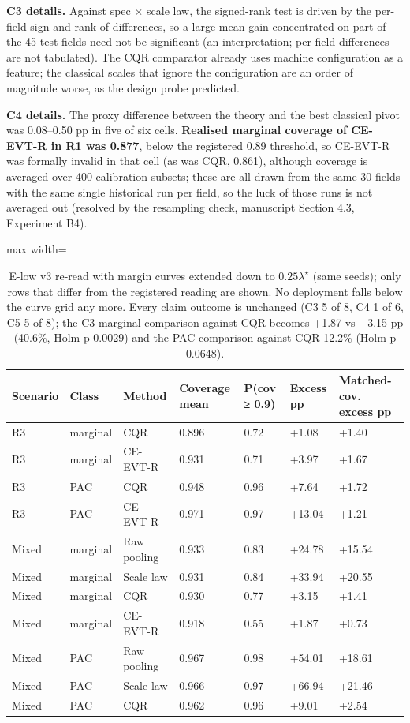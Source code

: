 \documentclass[preprint,12pt,authoryear]{elsarticle}
\begin{document}
\textbf{C3 details.} Against spec × scale law, the signed-rank test is driven by the per-field sign and rank of differences, so a large mean gain concentrated on part of the 45 test fields need not be significant (an interpretation; per-field differences are not tabulated). The CQR comparator already uses machine configuration as a feature; the classical scales that ignore the configuration are an order of magnitude worse, as the design probe predicted.

\textbf{C4 details.} The proxy difference between the theory and the best classical pivot was 0.08--0.50 pp in five of six cells. \textbf{Realised marginal coverage of CE-EVT-R in R1 was 0.877}, below the registered 0.89 threshold, so CE-EVT-R was formally invalid in that cell (as was CQR, 0.861), although coverage is averaged over 400 calibration subsets; these are all drawn from the same 30 fields with the same single historical run per field, so the luck of those runs is not averaged out (resolved by the resampling check, manuscript Section 4.3, Experiment B4).

\begin{table}[!htbp]
\centering
\footnotesize
\renewcommand{\thetable}{S18}\caption{E-low v3 re-read with margin curves extended down to \(0.25\lambda^\star\) (same seeds); only rows that differ from the registered reading are shown. No deployment falls below the curve grid any more. Every claim outcome is unchanged (C3 5 of 8, C4 1 of 6, C5 5 of 8); the C3 marginal comparison against CQR becomes +1.87 vs +3.15 pp (40.6\%, Holm p 0.0029) and the PAC comparison against CQR 12.2\% (Holm p 0.0648).}
\begin{adjustbox}{max width=\textwidth}
\begin{tabular}{@{}llllll>{\raggedright\arraybackslash}p{7.3em}@{}}
\toprule
\textbf{Scenario} & \textbf{Class} & \textbf{Method} & \textbf{Coverage mean} & \textbf{P(cov ≥ 0.9)} & \textbf{Excess pp} & \textbf{Matched-cov. excess pp} \\
\midrule
R3 & marginal & CQR & 0.896 & 0.72 & +1.08 & +1.40 \\
R3 & marginal & CE-EVT-R & 0.931 & 0.71 & +3.97 & +1.67 \\
R3 & PAC & CQR & 0.948 & 0.96 & +7.64 & +1.72 \\
R3 & PAC & CE-EVT-R & 0.971 & 0.97 & +13.04 & +1.21 \\
Mixed & marginal & Raw pooling & 0.933 & 0.83 & +24.78 & +15.54 \\
Mixed & marginal & Scale law & 0.931 & 0.84 & +33.94 & +20.55 \\
Mixed & marginal & CQR & 0.930 & 0.77 & +3.15 & +1.41 \\
Mixed & marginal & CE-EVT-R & 0.918 & 0.55 & +1.87 & +0.73 \\
Mixed & PAC & Raw pooling & 0.967 & 0.98 & +54.01 & +18.61 \\
Mixed & PAC & Scale law & 0.966 & 0.97 & +66.94 & +21.46 \\
Mixed & PAC & CQR & 0.962 & 0.96 & +9.01 & +2.54 \\
\bottomrule
\end{tabular}
\end{adjustbox}
\end{table}
\end{document}
